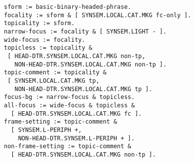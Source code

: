 \documentclass[a4paper]{article}
\begin{document}
{\small\begin{verbatim}
sform := basic-binary-headed-phrase.
focality := sform & [ SYNSEM.LOCAL.CAT.MKG fc-only ].
topicality := sform.
narrow-focus := focality & [ SYNSEM.LIGHT - ].
wide-focus := focality.
topicless := topicality &
 [ HEAD-DTR.SYNSEM.LOCAL.CAT.MKG non-tp,
   NON-HEAD-DTR.SYNSEM.LOCAL.CAT.MKG non-tp ].
topic-comment := topicality &
 [ SYNSEM.LOCAL.CAT.MKG tp,
   NON-HEAD-DTR.SYNSEM.LOCAL.CAT.MKG tp ].
focus-bg := narrow-focus & topicless.
all-focus := wide-focus & topicless &
  [ HEAD-DTR.SYNSEM.LOCAL.CAT.MKG fc ].
frame-setting := topic-comment & 
  [ SYNSEM.L-PERIPH +,
    NON-HEAD-DTR.SYNSEM.L-PERIPH + ].
non-frame-setting := topic-comment &
  [ HEAD-DTR.SYNSEM.LOCAL.CAT.MKG non-tp ].
\end{verbatim}}
\end{document}
